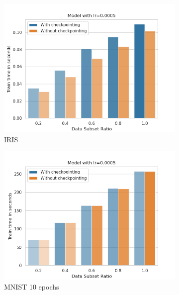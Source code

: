 \begin{figure}[h]
    \centering
    \begin{subfigure}[b]{0.24\textwidth}
        \centering
        \includegraphics[width=\textwidth]{figures/22_07/iris/train_subset_0.0005.png}
        \caption{IRIS}
        \label{fig:8a}
    \end{subfigure}
    \begin{subfigure}[b]{0.24\textwidth}
        \centering
        \includegraphics[width=\textwidth]{figures/22_07/10ep/train_subset_0.0005.png}
        \caption{MNIST 10 epochs}
        \label{fig:8b}
    \end{subfigure}
    \begin{subfigure}[b]{0.24\textwidth}

\end{subfigure}
\end{figure}
